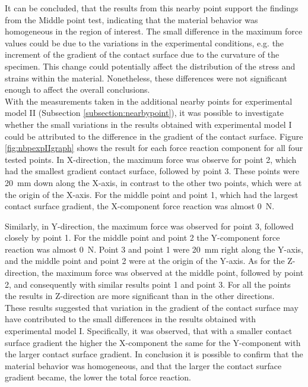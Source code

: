 It can be concluded, that the results from this nearby point support the 
findings from the Middle point test, indicating that the material behavior was
homogeneous in the region of interest. The small difference in the maximum force values could 
be due to the variations in the experimental conditions, e.g. the increment of the 
gradient of the contact surface due to the curvature of the specimen. This change 
could potentially affect the distribution of the stress and strains within the material.
Nonetheless, these differences were not significant enough to affect the overall conclusions.\\

With the measurements taken in the additional nearby points for experimental model II (Subsection \ref{subsection:nearbypoint}), 
it was possible to investigate whether the small variations in the results obtained with 
experimental model I could be attributed to the difference in the gradient of the contact surface.
Figure \ref{fig:nbpexpIIgraph} shows the result for each force reaction component for all four 
tested points. In X-direction, the maximum force was observe for point 2, which had the smallest gradient 
contact surface, followed by point 3. These points were \SI{20}{\milli \m} down along the X-axis, in contrast 
to the other two points, which were at the origin of the X-axis.
For the middle point and point 1, which had the largest contact surface gradient, the 
X-component force reaction was almost \SI{0}{\newton}. 

Similarly, in Y-direction, the maximum force was observed for point 3, followed closely by point 1. For 
the middle point and point 2 the Y-component force reaction was almost \SI{0}{\newton}.  Point 3 and point 1 were 
\SI{20}{\milli \m} right along the Y-axis, and the middle point and point 2 were at the origin of the Y-axis.
As for the Z-direction, the maximum force was observed at the middle point, followed by point 2, and consequently with 
similar results point 1 and point 3. For all the points the results in Z-direction are more significant than 
in the other directions.\\

These results suggested that variation in the gradient of the contact surface may have contributed
to the small differences in the results obtained with experimental model I. Specifically, it was observed, 
that with a smaller contact surface gradient the higher the X-component the same for the Y-component 
with the larger contact surface gradient. In conclusion it is possible to confirm that the material behavior was 
homogeneous, and that the larger the contact surface gradient became, the lower the total force reaction.

